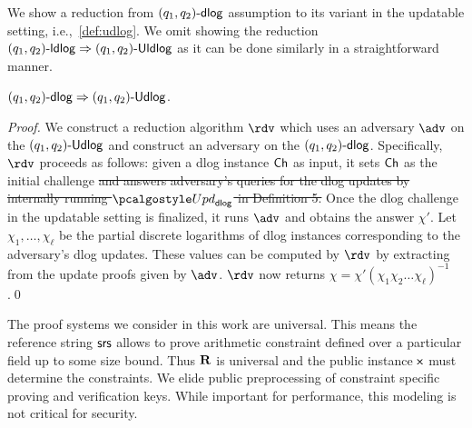 {We show a reduction from $(q_1, q_2)\text{-}\mathsf{dlog}$ assumption to its variant in the updatable setting, i.e.,~\cref{def:udlog}. We omit showing the reduction $(q_1, q_2)\text{-}\mathsf{ldlog} \Rightarrow (q_1, q_2)\text{-}\mathsf{Uldlog}$ as it can be done similarly in a straightforward manner.
\begin{lemma}
	$(q_1, q_2)\text{-}\mathsf{dlog} \Rightarrow (q_1, q_2)\text{-}\mathsf{Udlog}$.
	\end{lemma}
\begin{proof}
	We construct a reduction algorithm $\reduction$ which uses an adversary $\adv$ on the $(q_1, q_2)\text{-}\mathsf{Udlog}$ and construct an adversary on the $(q_1, q_2)\text{-}\mathsf{dlog}$. Specifically, $\reduction$ proceeds as follows: given a dlog instance $\mathsf{Ch}$ as input, it sets $\mathsf{Ch}$ as the initial challenge \sout{and answers adversary's queries for the dlog updates by internally running $\upd_{\dlog}$ in Definition 5.} Once the dlog challenge in the updatable setting is finalized, it runs $\adv$ and obtains the answer $\chi'$. Let $\chi_1, \ldots, \chi_\ell$ be the partial discrete logarithms of dlog instances corresponding to the adversary's dlog updates. These values can be computed by $\reduction$ by extracting from the update proofs given by $\adv$. $\reduction$ now returns  $\chi = \chi' (\chi_1 \chi_2 \ldots \chi_\ell)^{-1}$.\qed %
	\end{proof}
}
 The proof systems we consider in this work are universal. This means the reference string $\mathsf{srs}$ allows to prove arithmetic constraint defined over a particular field up to some size bound. Thus $\mathbf{R}$ is universal and the public instance $\mathsf{x}$ must determine the constraints. We elide public preprocessing of constraint specific proving and verification keys. While important for performance, this modeling is not critical for security.




